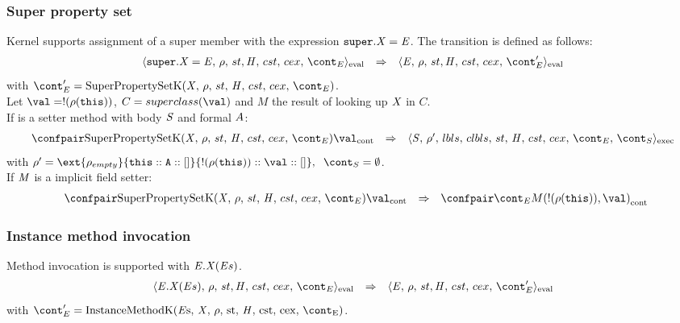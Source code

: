 \documentclass{article}
\begin{document}
\subsubsection{Super property set}
\label{subsubsec:super-property-set}
\newcommand{\SuperPropertySetK}{\mathrm{SuperPropertySetK}(\idmeta,\,\env,\,\strace,\,\handler,\,\cstrace,\,\cex,\,\econt)}
Kernel supports assignment of a super member with the expression $\tt{super}.\mathit{X}=\mathit{E}$. The transition is defined as follows:
\[
  \begin{array}{lcl}
	\cesktrans{
		\evalconf{\SuperPropertySet{\idmeta}{\expressionmeta}}{\env}{\strace}{\cstrace}{\cex}{\econt}}{
		\evalconf{\expressionmeta}{\env}{\strace}{\cstrace}{\cex}{\econt'}}\\
  \end{array}
\]
with $\econt' = \SuperPropertySetK$.\\
Let $\val = \deref{(\env(\this))}$, $C = \superclass{\val}$ and $M$ the result of looking up $\mathit{X}$ in $C$.\\
If is a setter method with body $\mathit{S}$ and formal $A$:
\[
  \begin{array}{lcl}
	\cesktrans{
		\contconf{\SuperPropertySetK}{\val}}{
		\execconf{\stmt}{\env'}{\lbls}{\clbls}{\handler}{\cstrace}{\cex}{\econt}{\scont}}\\
  \end{array}
\]
with $\env' =  \ext{\env_{empty}}{\this :: \formal :: []}{\deref{(\env(\this))} :: \val :: []}, \hspace{2mm}\scont = \emptyset$.\\
If $\mathit{M}$ is a implicit field setter:
\[
  \begin{array}{lcl}
	\hspace{2mm}
	\cesktrans{
		\contconf{\SuperPropertySetK}{\val}}{
		\contconf{\econt}{M(\deref{(\env(\this))}, \val)}}
  \end{array}
\]
\subsubsection{Instance method invocation}
\label{subsubsec:instance-method-invoc}
\newcommand{\InstanceMethodInvocation}[3]{#1.#2(#3)}
\newcommand{\InstanceMethodK}{\mathrm{InstanceMethodK(\expressionsmeta,\,\idmeta,\,\env,\,\strace,\,\handler,\,\cstrace,\,\cex,\,\econt)}}
Method invocation is supported with $\InstanceMethodInvocation{\expressionmeta}{\idmeta}{\expressionsmeta}$.
\[
  \begin{array}{lcl}
	\cesktrans{
		\evalconf{\InstanceMethodInvocation{\expressionmeta}{\idmeta}{\expressionsmeta}}{\env}{\strace}{\cstrace}{\cex}{\econt}}{
		\evalconf{\expressionmeta}{\env}{\strace}{\cstrace}{\cex}{\econt'}}
  \end{array}
\]
with $\econt' = \InstanceMethodK$.
\end{document}
